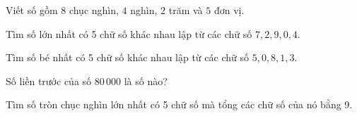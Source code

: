 \begin{ex} %
Viết số gồm $8$ chục nghìn, $4$ nghìn, $2$ trăm và $5$ đơn vị.
\end{ex}

\begin{ex} %
Tìm số lớn nhất có 5 chữ số khác nhau lập từ các chữ số $7, 2, 9, 0, 4$.
\end{ex}

\begin{ex} %
Tìm số bé nhất có 5 chữ số khác nhau lập từ các chữ số $5, 0, 8, 1, 3$.
\end{ex}

\begin{ex} %
Số liền trước của số $80\,000$ là số nào?
\end{ex}

\begin{ex} %
Tìm số tròn chục nghìn lớn nhất có 5 chữ số mà tổng các chữ số của nó bằng 9.
\end{ex}
